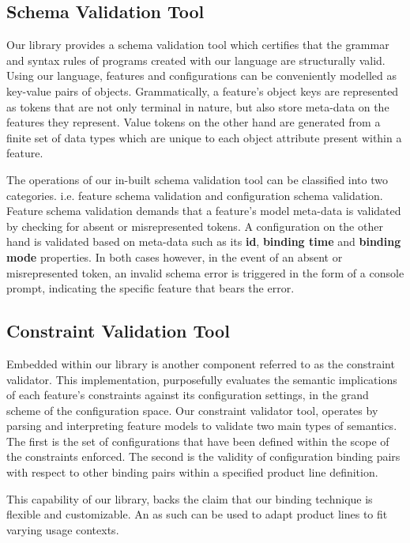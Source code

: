 \documentclass[conference]{IEEEtran}
\begin{document}
  \subsection{Schema Validation Tool} Our library provides a schema validation tool which certifies that the grammar and syntax rules of programs created with our language are structurally valid. Using our language, features and configurations can be conveniently modelled as key-value pairs of objects. Grammatically, a feature's object keys are represented as tokens that are not only terminal in nature, but also store meta-data on the features they represent. Value tokens on the other hand are generated from a finite set of data types which are unique to each object attribute present within a feature.
  
  The operations of our in-built schema validation tool can be classified into two categories. i.e. feature schema validation and configuration schema validation. Feature schema validation demands that a feature's model meta-data is validated by checking for absent or misrepresented tokens. A configuration on the other hand is validated based on meta-data such as its \textbf{id}, \textbf{binding time} and \textbf{binding mode} properties. In both cases however, in the event of an absent or misrepresented token, an invalid schema error is triggered in the form of a console prompt, indicating the specific feature that bears the error.
  
  \subsection{Constraint Validation Tool} Embedded within our library is another component referred to as the constraint validator. This implementation, purposefully evaluates the semantic implications of each feature's constraints against its configuration settings, in the grand scheme of the configuration space. Our constraint validator tool, operates by parsing and interpreting feature models to validate two main types of semantics. The first is the set of configurations that have been defined within the scope of the constraints enforced. The second is the validity of configuration binding pairs with respect to other binding pairs within a specified product line definition.
  
 This capability of our library, backs the claim that our binding technique is flexible and customizable. An as such can be used to adapt product lines to fit varying usage contexts.
\end{document}
